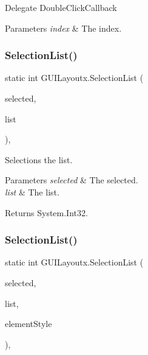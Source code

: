 Delegate Double\+Click\+Callback 


\begin{DoxyParams}{Parameters}
{\em index} & The index.\\
\hline
\end{DoxyParams}
\mbox{\label{class_g_u_i_layoutx_ad25129cd2a63a9b2d72f768711e5b09e}} 
\subsubsection{\texorpdfstring{Selection\+List()}{SelectionList()}\hspace{0.1cm}{\footnotesize\ttfamily [1/8]}}
{\footnotesize\ttfamily static int G\+U\+I\+Layoutx.\+Selection\+List (\begin{DoxyParamCaption}\item[{int}]{selected,  }\item[{G\+U\+I\+Content \mbox{[}$\,$\mbox{]}}]{list }\end{DoxyParamCaption})\hspace{0.3cm}{\ttfamily [inline]}, {\ttfamily [static]}}



Selections the list. 


\begin{DoxyParams}{Parameters}
{\em selected} & The selected.\\
\hline
{\em list} & The list.\\
\hline
\end{DoxyParams}
\begin{DoxyReturn}{Returns}
System.\+Int32.
\end{DoxyReturn}
\mbox{\label{class_g_u_i_layoutx_acf6b0ce4afa68d4dfeb3d467b51cf6d6}} 
\subsubsection{\texorpdfstring{Selection\+List()}{SelectionList()}\hspace{0.1cm}{\footnotesize\ttfamily [2/8]}}
{\footnotesize\ttfamily static int G\+U\+I\+Layoutx.\+Selection\+List (\begin{DoxyParamCaption}\item[{int}]{selected,  }\item[{G\+U\+I\+Content \mbox{[}$\,$\mbox{]}}]{list,  }\item[{G\+U\+I\+Style}]{element\+Style }\end{DoxyParamCaption})\hspace{0.3cm}{\ttfamily [inline]}, {\ttfamily [static]}}



